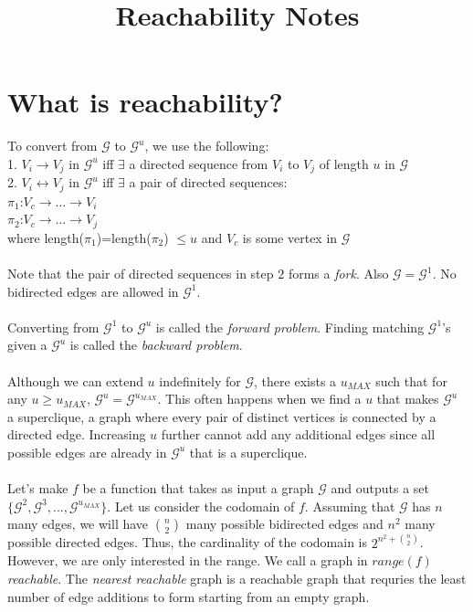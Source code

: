 \documentclass{article}
\theoremstyle{definition}
\begin{document}
\title{Reachability Notes}
\maketitle

\section{What is reachability?}

To convert from $\mathcal{G}$ to $\mathcal{G}^u$, we use the following:
\\
1. $V_i \rightarrow V_j$ in $\mathcal{G}^u$ iff $\exists$ a directed sequence from $V_i$ to $V_j$ of length $u$ in $\mathcal{G}$
\\
2. $V_i \leftrightarrow V_j$ in $\mathcal{G}^u$ iff $\exists$ a pair of directed sequences:
\\
$ \pi_1$:$ V_c \rightarrow ... \rightarrow V_i$
\\
$ \pi_2$:$ V_c \rightarrow ... \rightarrow V_j$
\\
where length($\pi_1$)=length($\pi_2$) $\leq u$ and $V_c$ is some vertex in $\mathcal{G}$ 
\\
\\
Note that the pair of directed sequences in step $2$ forms a \textit{fork}. Also $\mathcal{G}= \mathcal{G}^1$. No bidirected edges are allowed in $\mathcal{G}^1$.
\\
\\
Converting from $\mathcal{G}^1$ to $\mathcal{G}^u$ is called the \textit{forward problem}. Finding matching $\mathcal{G}^1$'s given a $\mathcal{G}^u$ is called the \textit{backward problem}. 
\\
\\
Although we can extend $u$ indefinitely for $\mathcal{G}$, there exists a $u_{MAX}$ such that for any $u \geq u_{MAX}$, $\mathcal{G}^u = \mathcal{G}^{u_{MAX}}$. This often happens when we find a $u$ that makes $\mathcal{G}^u$ a superclique, a graph where every pair of distinct vertices is connected by a directed edge. Increasing $u$ further cannot add any additional edges since all possible edges are already in $\mathcal{G}^u$ that is a superclique. 
\\
\\
Let's make $f$ be a function that takes as input a graph $\mathcal{G}$ and outputs a set $\{\mathcal{G}^2,\mathcal{G}^3,...,\mathcal{G}^{u_{MAX}}\}$. Let us consider the codomain of $f$. Assuming that $\mathcal{G}$ has $n$ many edges, we will have ${n \choose 2}$ many possible bidirected edges and $n^2$ many possible directed edges. Thus, the cardinality of the codomain is $2^{n^2+{n \choose 2}}$. However, we are only interested in the range. We call a graph in $range(f)$ \textit{reachable}. The \textit{nearest reachable} graph is a reachable graph that requries the least number of edge additions to form starting from an empty graph. 
\end{document}
